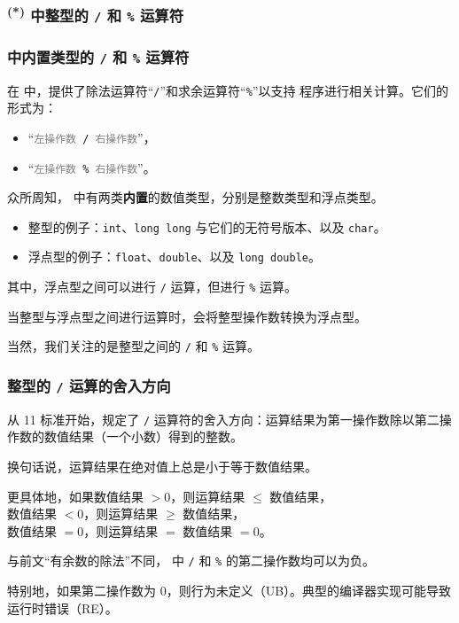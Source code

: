 \subsubsection{\texorpdfstring{\textsuperscript{(*) }}{(*) }\Cpp{} 中整型的 \texttt{/} 和 \texttt{\%} 运算符}
\begin{frame}[c]
  \progressnow
\end{frame}
\begin{frame}
  \frametitle{\Cpp{} 中\textbf{内置类型}的 \texttt{/} 和 \texttt{\%} 运算符}
  在 \Cpp{} 中，提供了\alert{除法运算符}“\texttt{/}”和\alert{求余运算符}“\texttt{\%}”以支持 \Cpp{} 程序进行相关计算。它们的形式为：
  \begin{itemize}
    \item “\texttt{\textcolor{gray}{左操作数} / \textcolor{gray}{右操作数}}”，
    \item “\texttt{\textcolor{gray}{左操作数} \% \textcolor{gray}{右操作数}}”。
  \end{itemize}
  \pause
  
  \emptyline
  众所周知，\Cpp{} 中有两类\textbf{内置}的数值类型，分别是\alert{整数类型}和\alert{浮点类型}。
  \begin{itemize}
    \item 整型的例子：\texttt{int}、\texttt{long long} 与它们的无符号版本、以及 \texttt{char}。
    \item 浮点型的例子：\texttt{float}、\texttt{double}、以及 \texttt{long double}。
  \end{itemize}
  \pause
  其中，浮点型之间可以进行 \texttt{/} 运算，但进行 \texttt{\%} 运算。
  
  当整型与浮点型之间进行运算时，会将整型操作数转换为浮点型。
  \pause
  
  \emptyline
  当然，我们关注的是整型之间的 \texttt{/} 和 \texttt{\%} 运算。
\end{frame}
\begin{frame}
  \frametitle{整型的 \texttt{/} 运算的舍入方向}
  从 \Cpp{}11 标准开始，规定了 \texttt{/} 运算符的舍入方向：运算结果为第一操作数除以第二操作数的数值结果（一个小数）得到的整数。
  \pause
  
  \emptyline
  换句话说，运算结果\alert{在绝对值上}总是小于等于数值结果。
  
  更具体地，如果数值结果 $> 0$，则运算结果 $\le$ 数值结果，\\
  \-\hspace{7em}数值结果 $< 0$，则运算结果 $\ge$ 数值结果，\\
  \-\hspace{7em}数值结果 $= 0$，则运算结果 $=$ 数值结果 $= 0$。
  \pause
  
  \emptyline
  与前文“有余数的除法”不同，\Cpp{} 中 \texttt{/} 和 \texttt{\%} 的\alert{第二操作数均可以为负}。
  \pause
  
  \emptyline
  特别地，如果第二操作数为 $0$，则行为未定义（UB）。典型的编译器实现可能导致运行时错误（RE）。
\end{frame}
